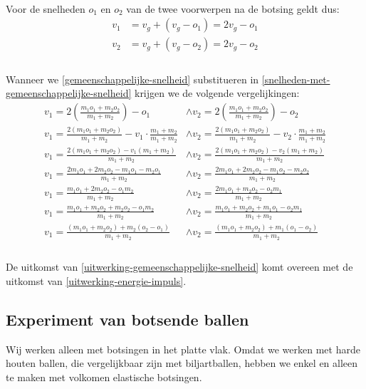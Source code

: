 \documentclass[12pt,a4paper]{article}
\begin{document}
	\\Voor de snelheden $o_1$ en $o_2$ van de twee voorwerpen na de botsing geldt dus:
	\begin{equation}
		\begin{aligned}
		\label{snelheden-met-gemeenschappelijke-snelheid}
			v_1&=v_g+(v_g-o_1)=2v_g-o_1\\
			v_2&=v_g+(v_g-o_2)=2v_g-o_2\\
		\end{aligned}
	\end{equation}
	\\Wanneer we \eqref{gemeenschappelijke-snelheid} substitueren in \eqref{snelheden-met-gemeenschappelijke-snelheid} krijgen we de volgende vergelijkingen:
	\begin{equation}
		\begin{aligned}
		\label{uitwerking-gemeenschappelijke-snelheid}
			v_1=2\left(\frac{m_1o_1+m_2o_2}{m_1+m_2}\right)-o_1 &\wedge v_2=2\left(\frac{m_1o_1+m_2o_2}{m_1+m_2}\right)-o_2\\
			v_1=\frac{2\left(m_1o_1+m_2o_2\right)}{m_1+m_2}-v_1\cdot\frac{m_1+m_2}{m_1+m_2} &\wedge v_2=\frac{2\left(m_1o_1+m_2o_2\right)}{m_1+m_2}-v_2\cdot\frac{m_1+m_2}{m_1+m_2}\\
			v_1=\frac{2\left(m_1o_1+m_2o_2\right)-v_1\left(m_1+m_2\right)}{m_1+m_2} &\wedge v_2=\frac{2\left(m_1o_1+m_2o_2\right)-v_2\left(m_1+m_2\right)}{m_1+m_2}\\
			v_1=\frac{2m_1o_1+2m_2o_2-m_1o_1-m_2o_1}{m_1+m_2} &\wedge v_2=\frac{2m_1o_1+2m_2o_2-m_1o_2-m_2o_2}{m_1+m_2}\\
			v_1=\frac{m_1o_1+2m_2o_2-o_1m_2}{m_1+m_2} &\wedge v_2=\frac{2m_1o_1+m_2o_2-o_2m_1}{m_1+m_2}\\
			v_1=\frac{m_1o_1+m_2o_2+m_2o_2-o_1m_2}{m_1+m_2} &\wedge v_2=\frac{m_1o_1+m_2o_2+m_1o_1-o_2m_1}{m_1+m_2}\\
			v_1=\frac{\left(m_1o_1+m_2o_2\right)+m_2\left(o_2-o_1\right)}{m_1+m_2} &\wedge v_2=\frac{\left(m_1o_1+m_2o_2\right)+m_1\left(o_1-o_2\right)}{m_1+m_2}\\
		\end{aligned}
	\end{equation}
	\\De uitkomst van \eqref{uitwerking-gemeenschappelijke-snelheid} komt overeen met de uitkomst van \eqref{uitwerking-energie-impuls}.

	\subsection{Experiment van botsende ballen}
	Wij werken alleen met botsingen in het platte vlak. Omdat we werken met harde houten ballen, die vergelijkbaar zijn met biljartballen, hebben we enkel en alleen te maken met volkomen elastische botsingen.
\end{document}
